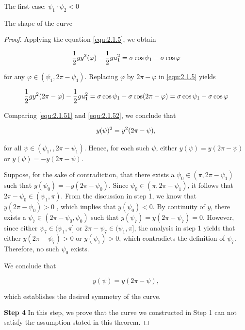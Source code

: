 \documentclass[letterpaper,reqno,10pt,twoside]{amsart}
\theoremstyle{definition}
\theoremstyle{remark}
\begin{document}
\begin{section}{The first case: $\psi_1\cdot \psi_2<0$ }
\begin{subsection}{The shape of the curve}
\begin{proof}
        Applying the equation \eqref{equ:2.1.5}, we obtain

        \begin{equation}{\label{equ:2.1.51}}
            \frac{1}{2}gy^{2}(\varphi)-\frac{1}{2}gu_1^{2}=\sigma\cos\psi_1-\sigma\cos\varphi
        \end{equation}

        \noindent for any $\varphi\in (\psi_1,2\pi-\psi_1)$. Replacing $\varphi$ by $2\pi-\varphi$ in \eqref{equ:2.1.5} yields

        \begin{equation}{\label{equ:2.1.52}}
            \frac{1}{2}gy^{2}(2\pi-\varphi)-\frac{1}{2}gu_1^{2}=\sigma\cos\psi_1-\sigma\cos(2\pi-\varphi)=\sigma\cos\psi_1-\sigma\cos\varphi
        \end{equation}

         Comparing \eqref{equ:2.1.51} and \eqref{equ:2.1.52}, we conclude that

        \begin{equation}{\label{equ:2.1.53}}
            y(\psi)^{2}=y^{2}(2\pi-\psi),
        \end{equation}

        \noindent for all $\psi\in(\psi_{1},,2\pi-\psi_{1})$. Hence, for each such $\psi$, either $y(\psi)=y(2\pi-\psi)$ or $y(\psi)=-y(2\pi-\psi)$.
        
        Suppose, for the sake of contradiction, that there exists a $\psi_0\in (\pi,2\pi-\psi_1)$ such that $y(\psi_0)=-y(2\pi-\psi_{0})$.  Since $\psi_0\in (\pi,2\pi-\psi_1)$, it follows that $2\pi-\psi_0\in(\psi_1,\pi)$. From the discussion in step 1,  we know that $y(2\pi-\psi_0)>0$ , which implies that $y(\psi_0)<0$. By continuity of $y$, there exists a $\psi_7\in(2\pi-\psi_0,\psi_0)$ such that $y(\psi_7)=y(2\pi-\psi_7)=0$. However, since either $\psi_7\in(\psi_1,\pi]$ or $2\pi-\psi_7\in(\psi_1,\pi]$, the analysis in step 1 yields that either $y(2\pi-\psi_7)> 0$ or $y(\psi_7)>0$, which contradicts the definition of $\psi_7$. Therefore, no such $\psi_{0}$ exists.
        
        We conclude that

        \begin{equation}
            y(\psi)=y(2\pi-\psi),
        \end{equation}

        \noindent which establishes the desired symmetry of the curve.

        
         \textbf{Step 4} In this step, we prove that the curve we constructed in Step 1 can not satisfy the assumption stated in this theorem.
         

\end{proof}
\end{subsection}
\end{section}
\end{document}
